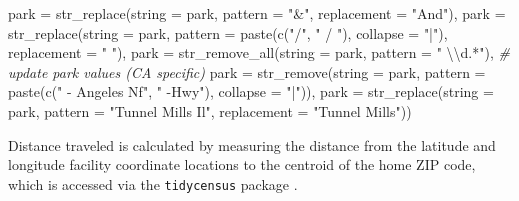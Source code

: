 \documentclass[
]{book}
\newenvironment{Shaded}{\begin{snugshade}}{\end{snugshade}}
\newcommand{\AttributeTok}[1]{\textcolor[rgb]{0.77,0.63,0.00}{#1}}
\newcommand{\CommentTok}[1]{\textcolor[rgb]{0.56,0.35,0.01}{\textit{#1}}}
\newcommand{\FunctionTok}[1]{\textcolor[rgb]{0.00,0.00,0.00}{#1}}
\newcommand{\NormalTok}[1]{#1}
\newcommand{\SpecialCharTok}[1]{\textcolor[rgb]{0.00,0.00,0.00}{#1}}
\newcommand{\StringTok}[1]{\textcolor[rgb]{0.31,0.60,0.02}{#1}}
\begin{document}
\begin{Shaded}
\begin{Highlighting}[]
    \AttributeTok{park =} \FunctionTok{str\_replace}\NormalTok{(}\AttributeTok{string =}\NormalTok{ park,}
                       \AttributeTok{pattern =} \StringTok{"\&"}\NormalTok{,}
                       \AttributeTok{replacement =} \StringTok{"And"}\NormalTok{),}
    \AttributeTok{park =} \FunctionTok{str\_replace}\NormalTok{(}\AttributeTok{string =}\NormalTok{ park,}
                       \AttributeTok{pattern =} \FunctionTok{paste}\NormalTok{(}\FunctionTok{c}\NormalTok{(}\StringTok{"/"}\NormalTok{, }\StringTok{" / "}\NormalTok{), }\AttributeTok{collapse =} \StringTok{"|"}\NormalTok{),}
                       \AttributeTok{replacement =} \StringTok{" "}\NormalTok{),}
    \AttributeTok{park =} \FunctionTok{str\_remove\_all}\NormalTok{(}\AttributeTok{string =}\NormalTok{ park,}
                          \AttributeTok{pattern =} \StringTok{" }\SpecialCharTok{\textbackslash{}\textbackslash{}}\StringTok{d.*"}\NormalTok{),}
    \CommentTok{\# update park values (CA specific)}
    \AttributeTok{park =} \FunctionTok{str\_remove}\NormalTok{(}\AttributeTok{string =}\NormalTok{ park,}
                      \AttributeTok{pattern =} \FunctionTok{paste}\NormalTok{(}\FunctionTok{c}\NormalTok{(}\StringTok{" {-} Angeles Nf"}\NormalTok{, }\StringTok{" {-}Hwy"}\NormalTok{), }
                                      \AttributeTok{collapse =} \StringTok{"|"}\NormalTok{)),}
    \AttributeTok{park =} \FunctionTok{str\_replace}\NormalTok{(}\AttributeTok{string =}\NormalTok{ park,}
                       \AttributeTok{pattern =} \StringTok{"Tunnel Mills Il"}\NormalTok{,}
                       \AttributeTok{replacement =} \StringTok{"Tunnel Mills"}\NormalTok{))}
\end{Highlighting}
\end{Shaded}

Distance traveled is calculated by measuring the distance from the latitude and longitude facility coordinate locations to the centroid of the home ZIP code, which is accessed via the \texttt{tidycensus} package \citep{R-tidycensus}.
\end{document}

